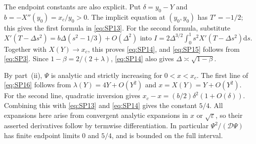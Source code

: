 The endpoint constants are also explicit. Put \(\delta=y_0-Y\) and
\(b=-X''(y_0)=x_c/y_0>0\). The implicit equation at \((y_0,y_0)\) has
\(T'=-1/2\); this gives the first formula in \eqref{eq:SP13}. For the
second formula, substitute
\(X'(T-\Delta s^2)=b\Delta(s^2-1/3)+O(\Delta^2)\) into
\(I=2\Delta^{3/2}\int_0^1s^2X'(T-\Delta s^2)\mathrm{d}s\). Together with
\(X(Y)\to x_c\), this proves \eqref{eq:SP14}, and \eqref{eq:SP15} follows
from \eqref{eq:SP3}. Since \(1-\beta=2/(2+\lambda)\), \eqref{eq:SP14}
also gives \(\Delta\asymp\sqrt{1-\beta}\).

By part~(ii), \(\Psi\) is analytic and strictly increasing for
\(0<x<x_c\). The first line of \eqref{eq:SP16} follows from
\(\lambda(Y)=4Y+O(Y^2)\) and \(x=X(Y)=Y+O(Y^2)\). For the second line, quadratic inversion gives
\(x_c-x=(b/2)\delta^2(1+O(\delta))\). Combining this with \eqref{eq:SP13} and
\eqref{eq:SP14} gives the constant \(5/4\). All expansions here arise from
convergent analytic expansions in \(x\) or \(\sqrt\varepsilon\), so
their asserted derivatives follow by termwise differentiation. In
particular \(\Psi^2/(\mathscr D\Psi)\) has finite endpoint limits \(0\)
and \(5/4\), and is bounded on the full interval.

